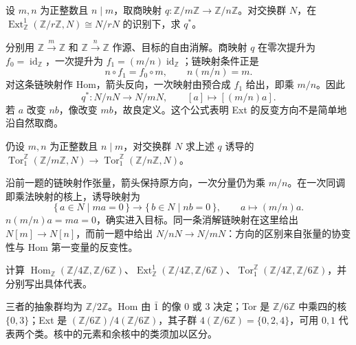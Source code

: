 \begin{exercise}\label{b4:ex:08-ext-map-cyclic}
	设 \(m,n\) 为正整数且 \(n\mid m\)，取商映射 \(q:\mathbb Z/m\mathbb Z\to\mathbb Z/n\mathbb Z\)。对交换群 \(N\)，在 \(\operatorname{Ext}_{\mathbb Z}^1(\mathbb Z/r\mathbb Z,N)\cong N/rN\) 的识别下，求 \(q^*\)。
\end{exercise}
\begin{solution}
	分别用 \(\mathbb Z\xrightarrow{m}\mathbb Z\) 和 \(\mathbb Z\xrightarrow{n}\mathbb Z\) 作源、目标的自由消解。商映射 \(q\) 在零次提升为 \(f_0=\operatorname{id}_{\mathbb Z}\)，一次提升为 \(f_1=(m/n)\operatorname{id}_{\mathbb Z}\)；链映射条件正是
	\[
		n\circ f_1=f_0\circ m,\qquad n(m/n)=m.
	\]
	对这条链映射作 Hom，箭头反向，一次映射由预合成 \(f_1\) 给出，即乘 \(m/n\)。因此
	\[
		q^*:N/nN\longrightarrow N/mN,\qquad [a]\longmapsto[(m/n)a].
	\]
	若 \(a\) 改变 \(nb\)，像改变 \(mb\)，故良定义。这个公式表明 Ext 的反变方向不是简单地沿自然取商。
\end{solution}

\begin{exercise}\label{b4:ex:08-tor-map-cyclic}
	仍设 \(m,n\) 为正整数且 \(n\mid m\)，对交换群 \(N\) 求上述 \(q\) 诱导的 \(\operatorname{Tor}_1^{\mathbb Z}(\mathbb Z/m\mathbb Z,N)\to\operatorname{Tor}_1^{\mathbb Z}(\mathbb Z/n\mathbb Z,N)\)。
\end{exercise}
\begin{solution}
	沿前一题的链映射作张量，箭头保持原方向，一次分量仍为乘 \(m/n\)。在一次同调即乘法映射的核上，诱导映射为
	\[
		\{\,a\in N\mid ma=0\,\}\longrightarrow\{\,b\in N\mid nb=0\,\}, \qquad a\longmapsto(m/n)a.
	\]
	\(n(m/n)a=ma=0\)，确实进入目标。同一条消解链映射在这里给出 \(N[m]\to N[n]\)，而前一题中给出 \(N/nN\to N/mN\)：方向的区别来自张量的协变性与 Hom 第一变量的反变性。
\end{solution}

\begin{exercise}\label{b4:ex:08-integer-four-six}
	计算 \(\operatorname{Hom}_{\mathbb Z}(\mathbb Z/4\mathbb Z,\mathbb Z/6\mathbb Z)\)、\(\operatorname{Ext}_{\mathbb Z}^1(\mathbb Z/4\mathbb Z,\mathbb Z/6\mathbb Z)\)、\(\operatorname{Tor}_1^{\mathbb Z}(\mathbb Z/4\mathbb Z,\mathbb Z/6\mathbb Z)\)，并分别写出具体代表。
\end{exercise}
\begin{solution}
	三者的抽象群均为 \(\mathbb Z/2\mathbb Z\)。Hom 由 \(\bar1\) 的像 \(0\) 或 \(3\) 决定；Tor 是 \(\mathbb Z/6\mathbb Z\) 中乘四的核 \(\{0,3\}\)；Ext 是 \((\mathbb Z/6\mathbb Z)/4(\mathbb Z/6\mathbb Z)\)，其子群 \(4(\mathbb Z/6\mathbb Z)=\{0,2,4\}\)，可用 \(0,1\) 代表两个类。核中的元素和余核中的类须加以区分。
\end{solution}

